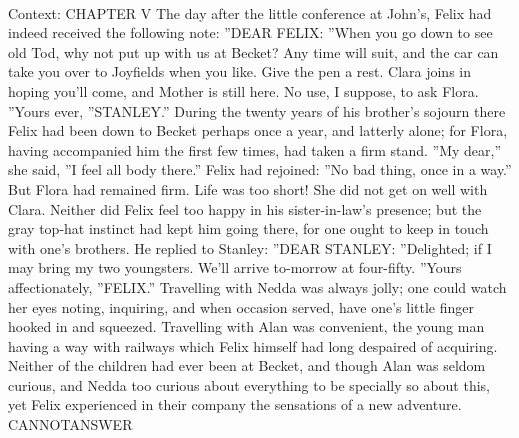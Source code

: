 \documentclass[11pt,a4paper, onecolumn]{article}
\begin{document}
\\ Context: CHAPTER V The day after the little conference at John's, Felix had indeed received the following note: ''DEAR FELIX: ''When you go down to see old Tod, why not put up with us at Becket? Any time will suit, and the car can take you over to Joyfields when you like. Give the pen a rest. Clara joins in hoping you'll come, and Mother is still here. No use, I suppose, to ask Flora. ''Yours ever, ''STANLEY.'' During the twenty years of his brother's sojourn there Felix had been down to Becket perhaps once a year, and latterly alone; for Flora, having accompanied him the first few times, had taken a firm stand. ''My dear,'' she said, ''I feel all body there.'' Felix had rejoined: ''No bad thing, once in a way.'' But Flora had remained firm. Life was too short! She did not get on well with Clara. Neither did Felix feel too happy in his sister-in-law's presence; but the gray top-hat instinct had kept him going there, for one ought to keep in touch with one's brothers. He replied to Stanley: ''DEAR STANLEY: ''Delighted; if I may bring my two youngsters. We'll arrive to-morrow at four-fifty. ''Yours affectionately, ''FELIX.'' Travelling with Nedda was always jolly; one could watch her eyes noting, inquiring, and when occasion served, have one's little finger hooked in and squeezed. Travelling with Alan was convenient, the young man having a way with railways which Felix himself had long despaired of acquiring. Neither of the children had ever been at Becket, and though Alan was seldom curious, and Nedda too curious about everything to be specially so about this, yet Felix experienced in their company the sensations of a new adventure. CANNOTANSWER
\end{document}
